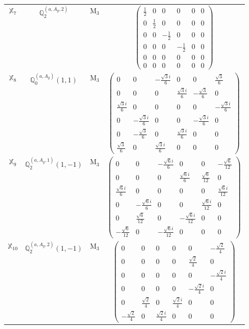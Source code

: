 \documentclass[fleqn,10pt,landscape]{article}
\begin{document}
\begin{itemize}
\begin{center}
\begin{longtable}{c|c|c|c}
$ \mathbb{X}_{7} $ & $\mathbb{Q}_{2}^{(a,A_{g},2)}$ & M$_{3}$ & $\begin{pmatrix} \frac{1}{2} & 0 & 0 & 0 & 0 & 0 \\ 0 & \frac{1}{2} & 0 & 0 & 0 & 0 \\ 0 & 0 & - \frac{1}{2} & 0 & 0 & 0 \\ 0 & 0 & 0 & - \frac{1}{2} & 0 & 0 \\ 0 & 0 & 0 & 0 & 0 & 0 \\ 0 & 0 & 0 & 0 & 0 & 0 \end{pmatrix}$ \\
$ \mathbb{X}_{8} $ & $\mathbb{Q}_{0}^{(a,A_{g})}(1,1)$ & M$_{3}$ & $\begin{pmatrix} 0 & 0 & - \frac{\sqrt{3} i}{6} & 0 & 0 & \frac{\sqrt{3}}{6} \\ 0 & 0 & 0 & \frac{\sqrt{3} i}{6} & - \frac{\sqrt{3}}{6} & 0 \\ \frac{\sqrt{3} i}{6} & 0 & 0 & 0 & 0 & - \frac{\sqrt{3} i}{6} \\ 0 & - \frac{\sqrt{3} i}{6} & 0 & 0 & - \frac{\sqrt{3} i}{6} & 0 \\ 0 & - \frac{\sqrt{3}}{6} & 0 & \frac{\sqrt{3} i}{6} & 0 & 0 \\ \frac{\sqrt{3}}{6} & 0 & \frac{\sqrt{3} i}{6} & 0 & 0 & 0 \end{pmatrix}$ \\
$ \mathbb{X}_{9} $ & $\mathbb{Q}_{2}^{(a,A_{g},1)}(1,-1)$ & M$_{3}$ & $\begin{pmatrix} 0 & 0 & - \frac{\sqrt{6} i}{6} & 0 & 0 & - \frac{\sqrt{6}}{12} \\ 0 & 0 & 0 & \frac{\sqrt{6} i}{6} & \frac{\sqrt{6}}{12} & 0 \\ \frac{\sqrt{6} i}{6} & 0 & 0 & 0 & 0 & \frac{\sqrt{6} i}{12} \\ 0 & - \frac{\sqrt{6} i}{6} & 0 & 0 & \frac{\sqrt{6} i}{12} & 0 \\ 0 & \frac{\sqrt{6}}{12} & 0 & - \frac{\sqrt{6} i}{12} & 0 & 0 \\ - \frac{\sqrt{6}}{12} & 0 & - \frac{\sqrt{6} i}{12} & 0 & 0 & 0 \end{pmatrix}$ \\
$ \mathbb{X}_{10} $ & $\mathbb{Q}_{2}^{(a,A_{g},2)}(1,-1)$ & M$_{3}$ & $\begin{pmatrix} 0 & 0 & 0 & 0 & 0 & - \frac{\sqrt{2}}{4} \\ 0 & 0 & 0 & 0 & \frac{\sqrt{2}}{4} & 0 \\ 0 & 0 & 0 & 0 & 0 & - \frac{\sqrt{2} i}{4} \\ 0 & 0 & 0 & 0 & - \frac{\sqrt{2} i}{4} & 0 \\ 0 & \frac{\sqrt{2}}{4} & 0 & \frac{\sqrt{2} i}{4} & 0 & 0 \\ - \frac{\sqrt{2}}{4} & 0 & \frac{\sqrt{2} i}{4} & 0 & 0 & 0 \end{pmatrix}$ \\

\end{longtable}
\end{center}
\end{itemize}
\end{document}
